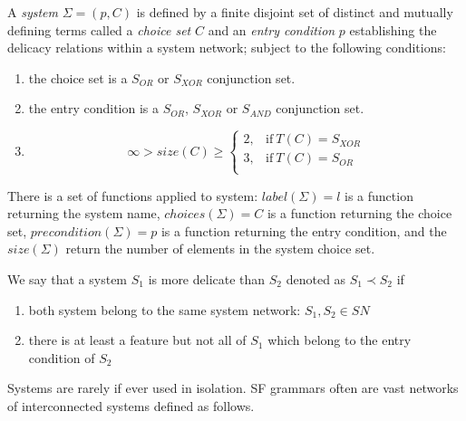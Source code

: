 \begin{definition}[System]\label{def:formal-system}
A \textit{system} $\Sigma=(p,C)$ is defined by a finite disjoint set of distinct and mutually defining terms called a \textit{choice set} $C$ and an \textit{entry condition} $p$ establishing the delicacy relations within a system network; subject to the following conditions: 
\begin{enumerate}
	\item the choice set is a $S_{OR}$ or $S_{XOR}$ conjunction set.
	\item the entry condition is a $S_{OR}$, $S_{XOR}$ or $S_{AND}$ conjunction set.
	\item \begin{equation*}
	\infty > size(C) \geq
	\begin{cases}
	2, & \text{if}\ T(C) = S_{XOR} \\
	3, & \text{if}\ T(C) = S_{OR} \\
	\end{cases}
	\end{equation*}
\end{enumerate} 
\end{definition}

There is a set of functions applied to system: $label(\Sigma)=l$ is a function returning the system name, $choices(\Sigma)=C$ is a function returning the choice set, $precondition(\Sigma)=p$ is a function returning the entry condition, and the $size(\Sigma)$ return the number of elements in the system choice set.  

\begin{definition}\label{def:delicacy-hierarchy}
	We say that a system $S_{1}$ is more delicate than $S_{2}$ denoted as $S_{1} \prec S_{2}$ if 
	\begin{enumerate}
		\item both system belong to the same system network: $S_{1}, S_{2} \in SN$ 
		\item there is at least a feature but not all of $S_{1}$ which belong to the entry condition of $S_{2}$  
	\end{enumerate} 
\end{definition}

Systems are rarely if ever used in isolation. SF grammars often are vast networks of interconnected systems defined as follows. 

